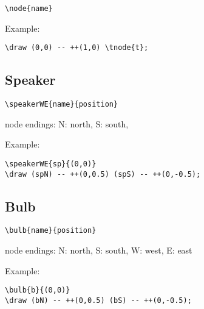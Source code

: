 \documentclass[parskip=full]{scrartcl}
\begin{document}
\begin{verbatim}
\node{name}
\end{verbatim}

Example:\\
\begin{minipage}{0.8\textwidth}
\begin{verbatim}
\draw (0,0) -- ++(1,0) \tnode{t};
\end{verbatim}
\end{minipage}
\begin{minipage}{0.19\textwidth}
\end{minipage}

\subsection{Speaker}

\begin{verbatim}
\speakerWE{name}{position}
\end{verbatim}
node endings: N: north, S: south,

Example:\\
\begin{minipage}{0.8\textwidth}
\begin{verbatim}
\speakerWE{sp}{(0,0)}
\draw (spN) -- ++(0,0.5) (spS) -- ++(0,-0.5);
\end{verbatim}
\end{minipage}
\begin{minipage}{0.19\textwidth}
\end{minipage}

\subsection{Bulb}

\begin{verbatim}
\bulb{name}{position}
\end{verbatim}
node endings: N: north, S: south, W: west, E: east

Example:\\
\begin{minipage}{0.8\textwidth}
\begin{verbatim}
\bulb{b}{(0,0)}
\draw (bN) -- ++(0,0.5) (bS) -- ++(0,-0.5);
\end{verbatim}
\end{minipage}
\begin{minipage}{0.19\textwidth}
\end{minipage}
\end{document}
